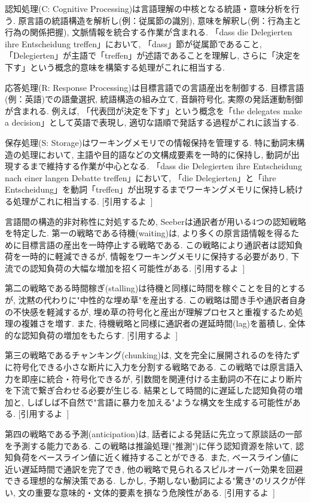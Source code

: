認知処理(C: Cognitive Processing)は言語理解の中核となる統語・意味分析を行う.
原言語の統語構造を解析し(例：従属節の識別), 意味を解釈し(例：行為主と行為の関係把握), 文脈情報を統合する作業が含まれる.
「dass die Delegierten ihre Entscheidung treffen」において, 「dass」節が従属節であること, 「Delegierten」が主語で「treffen」が述語であることを理解し, さらに「決定を下す」という概念的意味を構築する処理がこれに相当する.

応答処理(R: Response Processing)は目標言語での言語産出を制御する.
目標言語(例：英語)での語彙選択, 統語構造の組み立て, 音韻符号化, 実際の発話運動制御が含まれる.
例えば, 「代表団が決定を下す」という概念を「the delegates make a decision」として英語で表現し, 適切な語順で発話する過程がこれに該当する.

保存処理(S: Storage)はワーキングメモリでの情報保持を管理する.
特に動詞末構造の処理において, 主語や目的語などの文構成要素を一時的に保持し, 動詞が出現するまで維持する作業が中心となる.
「dass die Delegierten ihre Entscheidung nach einer langen Debatte treffen」において, 「die Delegierten」と「ihre Entscheidung」を動詞「treffen」が出現するまでワーキングメモリに保持し続ける処理がこれに相当する.
[引用するよ~]

言語間の構造的非対称性に対処するため, Seeberは通訳者が用いる4つの認知戦略を特定した.
第一の戦略である待機(waiting)は, より多くの原言語情報を得るために目標言語の産出を一時停止する戦略である.
この戦略により通訳者は認知負荷を一時的に軽減できるが, 情報をワーキングメモリに保持する必要があり, 下流での認知負荷の大幅な増加を招く可能性がある.
[引用するよ~]

第二の戦略である時間稼ぎ(stalling)は待機と同様に時間を稼ぐことを目的とするが, 沈黙の代わりに"中性的な埋め草"を産出する.
この戦略は聞き手や通訳者自身の不快感を軽減するが, 埋め草の符号化と産出が理解プロセスと重複するため処理の複雑さを増す.
また, 待機戦略と同様に通訳者の遅延時間(lag)を蓄積し, 全体的な認知負荷の増加をもたらす.
[引用するよ~]

第三の戦略であるチャンキング(chunking)は, 文を完全に展開されるのを待たずに符号化できる小さな断片に入力を分割する戦略である.
この戦略では原言語入力を即座に統合・符号化できるが, 引数間を関連付ける主動詞の不在により断片を下流で繋ぎ合わせる必要が生じる.
結果として時間的に遅延した認知負荷の増加と, しばしば不自然で"言語に暴力を加える"ような構文を生成する可能性がある.
[引用するよ~]

第四の戦略である予測(anticipation)は, 話者による発話に先立って原談話の一部を予測する能力である.
この戦略は推論処理("推測")に伴う認知資源を除いて, 認知負荷をベースライン値に近く維持することができる.
また, ベースライン値に近い遅延時間で通訳を完了でき, 他の戦略で見られるスピルオーバー効果を回避できる理想的な解決策である.
しかし, 予期しない動詞による"驚き"のリスクが伴い, 文の重要な意味的・文体的要素を損なう危険性がある.
[引用するよ~]

